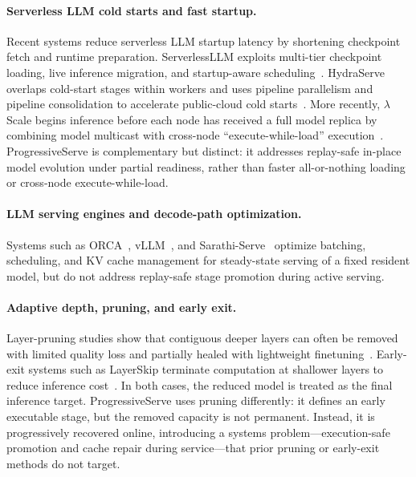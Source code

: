 \documentclass[sigplan,anonymous,review,nonacm]{acmart}
\begin{document}
\paragraph{Serverless LLM cold starts and fast startup.}
Recent systems reduce serverless LLM startup latency by shortening checkpoint fetch and runtime preparation. ServerlessLLM exploits multi-tier checkpoint loading, live inference migration, and startup-aware scheduling~\cite{serverlessllm}. HydraServe overlaps cold-start stages within workers and uses pipeline parallelism and pipeline consolidation to accelerate public-cloud cold starts~\cite{hydraserve}. More recently, $\lambda$Scale begins inference before each node has received a full model replica by combining model multicast with cross-node ``execute-while-load'' execution~\cite{lscale}. ProgressiveServe is complementary but distinct: it addresses replay-safe in-place model evolution under partial readiness, rather than faster all-or-nothing loading or cross-node execute-while-load.

\paragraph{LLM serving engines and decode-path optimization.}
Systems such as ORCA~\cite{yu2022orca}, vLLM~\cite{vllm_sosp23}, and Sarathi-Serve~\cite{agrawal2024sarathiserve} optimize batching, scheduling, and KV cache management for steady-state serving of a fixed resident model, but do not address replay-safe stage promotion during active serving.

\paragraph{Adaptive depth, pruning, and early exit.}
Layer-pruning studies show that contiguous deeper layers can often be removed with limited quality loss and partially healed with lightweight finetuning~\cite{gromov2024deeperlayers,fan2020layerdrop, sanh2020movement}. Early-exit systems such as LayerSkip terminate computation at shallower layers to reduce inference cost~\cite{elhoushi2024layerskip}. In both cases, the reduced model is treated as the final inference target. ProgressiveServe uses pruning differently: it defines an early executable stage, but the removed capacity is not permanent. Instead, it is progressively recovered online, introducing a systems problem---execution-safe promotion and cache repair during service---that prior pruning or early-exit methods do not target.
\end{document}

